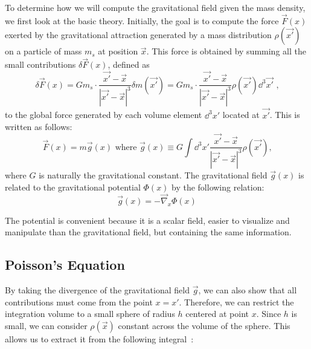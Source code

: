 To determine how we will compute the gravitational field given the mass density, we first look at the basic theory. Initially, the goal is to compute the force $\Vec{F}(x)$ exerted by the gravitational attraction generated by a mass distribution $\rho(\Vec{x'})$ on a particle of mass $m_s$ at position $\Vec{x}$. This force is obtained by summing all the small contributions $\delta\Vec{F}(x)$, defined as
\begin{equation}
\label{eq:fg_small_contrib}
\delta\Vec{F}(x) = Gm_s \cdot \frac{\Vec{x'} - \Vec{x}}{|\Vec{x'} - \Vec{x}|^3}\delta m(\Vec{x'}) = Gm_s \cdot \frac{\Vec{x'} - \Vec{x}}{|\Vec{x'} - \Vec{x}|^3}\rho(\Vec{x'}) \dd^3 \Vec{x'}\text{ ,}
\end{equation}
to the global force generated by each volume element $\dd^3 x'$ located at $\Vec{x'}$. This is written as follows:
\begin{equation}
\label{eq:fg_def}
\Vec{F}(x) = m\Vec{g}(x) \text{ where } \Vec{g}(x) \equiv G \int \dd^3 x' \frac{\Vec{x'} - \Vec{x}}{|\Vec{x'} - \Vec{x}|^3}\rho(\Vec{x'})\text{,}
\end{equation}
where $G$ is naturally the gravitational constant.
The gravitational field $\Vec{g}(x)$ is related to the gravitational potential $\Phi(x)$ by the following relation:
\begin{equation}
\label{eq:gfield_to_phi}
\Vec{g}(x) = - \Vec{\nabla}_x \Phi(x)
\end{equation}

The potential is convenient because it is a scalar field, easier to visualize and manipulate than the gravitational field, but containing the same information.

\subsection{Poisson's Equation}

By taking the divergence of the gravitational field $\Vec{g}$, we can also show that all contributions must come from the point $x=x'$. Therefore, we can restrict the integration volume to a small sphere of radius $h$ centered at point $x$. Since $h$ is small, we can consider $\rho(\Vec{x})$ constant across the volume of the sphere. This allows us to extract it from the following integral~\cite{binney2011galactic}:


